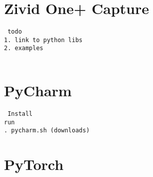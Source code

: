 \section{Zivid One+ Capture}
\begin{verbatim}
 todo
1. link to python libs
2. examples
   
\end{verbatim}


\section{PyCharm}
\begin{verbatim}
 Install 
run
. pycharm.sh (downloads)   
\end{verbatim}


\section{PyTorch}

